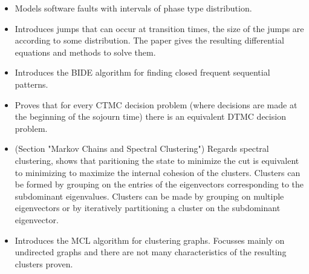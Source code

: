 \begin{itemize}
\item \citep{Okamura2006} Models software faults with intervals of phase type distribution.
\item\citep{Tzenova2005} Introduces jumps that can occur at transition times, the size of the jumps are according to some distribution. The paper gives the resulting differential equations and methods to solve them.
\item\citep{Wang2004} Introduces the BIDE algorithm for finding closed frequent sequential patterns.
\item\citep{Serfozo1979} Proves that for every CTMC decision problem (where decisions are made at the beginning of the sojourn time) there is an equivalent DTMC decision problem.
\item\citep{Liu2011} (Section "Markov Chains and Spectral Clustering") Regards spectral clustering, shows that paritioning the state to minimize the cut is equivalent to minimizing to maximize the internal cohesion of the clusters. Clusters can be formed by grouping on the entries of the eigenvectors corresponding to the subdominant eigenvalues. Clusters can be made by grouping on multiple eigenvectors or by iteratively partitioning a cluster on the subdominant eigenvector.
\item\citep{Dongen2000} Introduces the MCL algorithm for clustering graphs. Focusses mainly on undirected graphs and there are not many characteristics of the resulting clusters proven.

\end{itemize}
